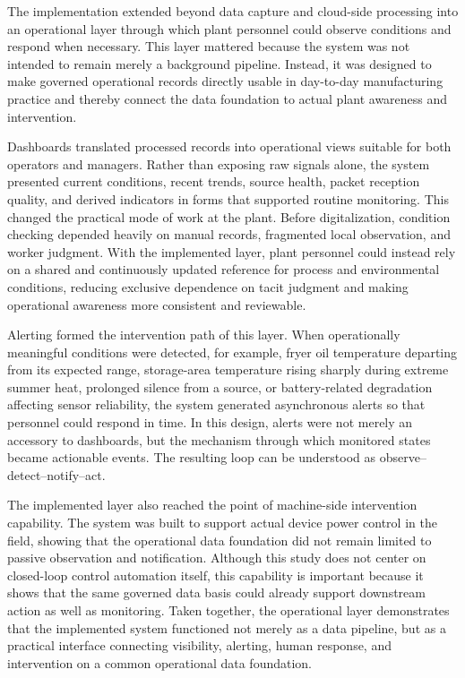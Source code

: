 \documentclass[systems,article,accept,pdftex,moreauthors]{Definitions/mdpi}
\begin{document}
The implementation extended beyond data capture and cloud-side processing into an operational layer through which plant personnel could observe conditions and respond when necessary. This layer mattered because the system was not intended to remain merely a background pipeline. Instead, it was designed to make governed operational records directly usable in day-to-day manufacturing practice and thereby connect the data foundation to actual plant awareness and intervention.

Dashboards translated processed records into operational views suitable for both operators and managers. Rather than exposing raw signals alone, the system presented current conditions, recent trends, source health, packet reception quality, and derived indicators in forms that supported routine monitoring. This changed the practical mode of work at the plant. Before digitalization, condition checking depended heavily on manual records, fragmented local observation, and worker judgment. With the implemented layer, plant personnel could instead rely on a shared and continuously updated reference for process and environmental conditions, reducing exclusive dependence on tacit judgment and making operational awareness more consistent and reviewable.

Alerting formed the intervention path of this layer. When operationally meaningful conditions were detected, for example, fryer oil temperature departing from its expected range, storage-area temperature rising sharply during extreme summer heat, prolonged silence from a source, or battery-related degradation affecting sensor reliability, the system generated asynchronous alerts so that personnel could respond in time. In this design, alerts were not merely an accessory to dashboards, but the mechanism through which monitored states became actionable events. The resulting loop can be understood as observe--detect--notify--act.

The implemented layer also reached the point of machine-side intervention capability. The system was built to support actual device power control in the field, showing that the operational data foundation did not remain limited to passive observation and notification. Although this study does not center on closed-loop control automation itself, this capability is important because it shows that the same governed data basis could already support downstream action as well as monitoring. Taken together, the operational layer demonstrates that the implemented system functioned not merely as a data pipeline, but as a practical interface connecting visibility, alerting, human response, and intervention on a common operational data foundation.
\end{document}
